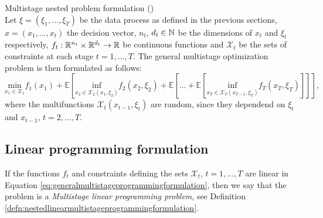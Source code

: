 \begin{defn}{\normalfont Multistage nested problem formulation} \label{defn:generalmultistageprogrammingformulation}
{\normalfont (\cite[Section 3.1.1.]{stochasticprogrammingbible2009})}
 \\
Let $\xi=(\xi_1,\dots,\xi_{T})$ be the data process as defined in the previous sections, \\ $x=(x_1,\dots,x_t)$ the decision vector, $n_t$, $d_t \in \mathbb{N}$ be the dimensions of $x_t$ and $\xi_t$ respectively, $f_t: \mathbb{R}^{n_t} \times \mathbb{R}^{d_t} \rightarrow \mathbb{R}$ be continuous functions and $
\mathcal{X}_t$ be the sets of constraints at each stage $t=1,\dots,T$. The general multistage optimization problem is then formulated as follows:
\footnotesize
\begin{equation}
\label{eq:generalmultistageprogrammingformulation}
\underset{x_1 \in \mathcal{X}_1}{\mathrm{min}}
 f_1(x_1) + \mathbb{E}\left[ \underset{x_2 \in \mathcal{X}_2(x_1, \xi_2)}{\mathrm{inf}} f_2(x_2,\xi_2) + \mathbb{E}\left[\dots + \mathbb{E}\left[ \underset{x_T \in \mathcal{X}_T(x_{T-1}, \xi_T)}{\mathrm{inf}} f_T(x_T,\xi_T)\right] \right] \right],
\end{equation}
\normalsize
where the multifunctions $\mathcal{X}_t(x_{t-1},\xi_t)$ are random, since they dependend on $\xi_t$ and $x_{t-1}$, $t=2,\dots,T$.
\end{defn}


\newpage
\subsection{Linear programming formulation}
If the functions $f_t$ and constraints defining the sets $\mathcal{X}_t$, $t=1,\dots,T$ are linear in Equation \ref{eq:generalmultistageprogrammingformulation}, then we say that the problem is a \textit{Multistage linear programming problem}, see Definition \ref{defn:nestedlinearmultistageprogrammingformulation}.

